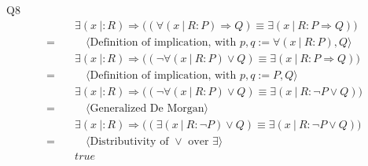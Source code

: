 \documentclass{article}
\begin{document}
    \vspace{10mm}
    Q8
    \begin{align*}
        & \quad \exists(x\: |: R) \Longrightarrow \bigl(( \forall(x\: |\: R : P) \Longrightarrow Q) \equiv \exists(x\: |\: R : P \Longrightarrow Q)\bigr) \\
        = & \quad\quad \langle \text{Definition of implication, with } p,q := \forall(x\: |\: R : P),Q \rangle \\
        & \quad \exists(x\: |: R) \Longrightarrow \bigl(( \neg\forall(x\: |\: R : P) \vee Q) \equiv \exists(x\: |\: R : P \Longrightarrow Q)\bigr) \\
        = & \quad\quad \langle \text{Definition of implication, with } p,q := P,Q \rangle \\
        & \quad \exists(x\: |: R) \Longrightarrow \bigl(( \neg\forall(x\: |\: R : P) \vee Q) \equiv \exists(x\: |\: R : \neg P \vee Q)\bigr) \\
        = & \quad\quad \langle \text{Generalized De Morgan} \rangle \\
        & \quad \exists(x\: |: R) \Longrightarrow \bigl(( \exists(x\: |\: R : \neg P) \vee Q) \equiv \exists(x\: |\: R : \neg P \vee Q)\bigr) \\
        = & \quad\quad \langle \text{Distributivity of } \vee \text{ over } \exists \rangle \\
        & \quad true \\
    \end{align*}
\end{document}

